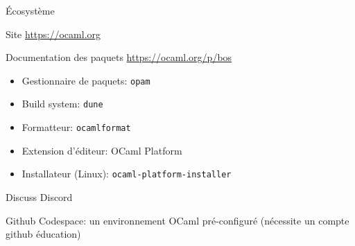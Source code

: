 
\begin{frame}{Écosystème}
    

Site \url{https://ocaml.org}

Documentation des paquets \url{https://ocaml.org/p/bos}


\begin{itemize}
\item Gestionnaire de paquets: \texttt{opam}
\item Build system: \texttt{dune}
\item Formatteur: \texttt{ocamlformat}
\item Extension d'éditeur: OCaml Platform
\item Installateur (Linux): \texttt{ocaml-platform-installer}
\end{itemize}
    

Discuss
Discord


Github Codespace: un environnement OCaml pré-configuré (nécessite un compte github éducation)

    
\end{frame}
